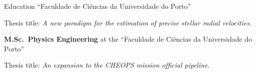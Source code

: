 
\begin{rubric}{Education}
%
	 ``Faculdade de Ciências da Universidade do Porto''

	\par Thesis title: \emph{A new paradigm for the estimation of precise stellar radial velocities.}
%

\entry*[\dates{2014/2019}]%
	\textbf{M.Sc.~Physics Engineering} at the ``Faculdade de Ciências da Universidade do Porto''\par
	Thesis title: \emph{An expansion to the CHEOPS mission official pipeline}. 

\end{rubric}



